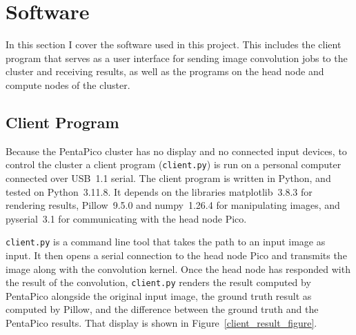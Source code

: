 \documentclass[conference]{IEEEtran}
\begin{document}
\section{Software}
\label{software_sec}

In this section I cover the software used in this project.
This includes the client program that serves as a user interface for sending image convolution jobs to the cluster and receiving results, as well as the programs on the head node and compute nodes of the cluster.

\subsection{Client Program}

Because the PentaPico cluster has no display and no connected input devices, to control the cluster a client program (\texttt{client.py}) is run on a personal computer connected over USB~1.1 serial.
The client program is written in Python, and tested on Python~3.11.8. 
It depends on the libraries matplotlib~3.8.3 for rendering results, Pillow~9.5.0 and numpy~1.26.4 for manipulating images, and pyserial~3.1 for communicating with the head node Pico.

\texttt{client.py} is a command line tool that takes the path to an input image as input.
It then opens a serial connection to the head node Pico and transmits the image along with the convolution kernel.
Once the head node has responded with the result of the convolution, \texttt{client.py} renders the result computed by PentaPico alongside the original input image, the ground truth result as computed by Pillow, and the difference between the ground truth and the PentaPico results.
That display is shown in Figure~\ref{client_result_figure}.
\end{document}
